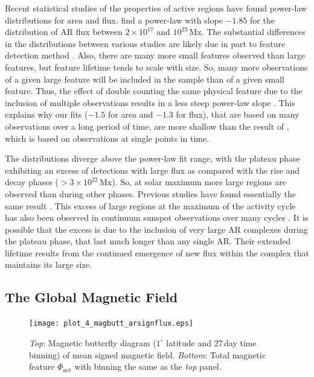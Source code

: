 Recent statistical studies of the properties of active regions have found power-law distributions for area and flux. \citet{parnell:2009} find a power-law with slope $-1.85$ for the distribution of \gls{AR} flux between $2\times10^{17}$ and $10^{23}$\,Mx. The substantial differences in the distributions between various studies are likely due in part to feature detection method \citep{deforest:2007}. Also, there are many more small features observed than large features, but feature lifetime tends to scale with size. So, many more observations of a given large feature will be included in the sample than of a given small feature. Thus, the effect of double counting the same physical feature due to the inclusion of multiple observations results in a less steep power-law slope \citep{tang:1984}. This explains why our fits ($-1.5$ for area and $-1.3$ for flux), that are based on many observations over a long period of time, are more shallow than the result of \citet{parnell:2009}, which is based on observations at single points in time. 

The distributions diverge above the power-law fit range, with the plateau phase exhibiting an excess of detections with large flux as compared with the rise and decay phases ($>$$3\times10^{22}$\,Mx). So, at solar maximum more large regions are observed than during other phases. Previous studies have found essentially the same result \citep{tang:1984,harvey:1993,meunier:2003}. This excess of large regions at the maximum of the activity cycle has also been observed in continuum sunspot observations over many cycles \citep{Hathaway:2010b}. It is possible that the excess is due to the inclusion of very large AR complexes during the plateau phase, that last much longer than any single AR. Their extended lifetime results from the continued emergence of new flux within the complex that maintains its large size.


\subsection{The Global Magnetic Field}\label{subsect_imbharm}


\begin{figure}[!t]
\centerline{\texttt{[image: plot\_4\_magbutt\_arsignflux.eps]}}
\caption[Magnetic butterfly diagram of mean signed field.]{\emph{Top}: Magnetic butterfly diagram ($1^{\circ}$ latitude and 27\,day time binning) of mean signed magnetic field. \emph{Bottom}: Total magnetic feature $\Phi_{\mathrm{net}}$ with binning the same as the \emph{top} panel.}
\label{plot_4_magbutt_arsignflux}
\end{figure}

